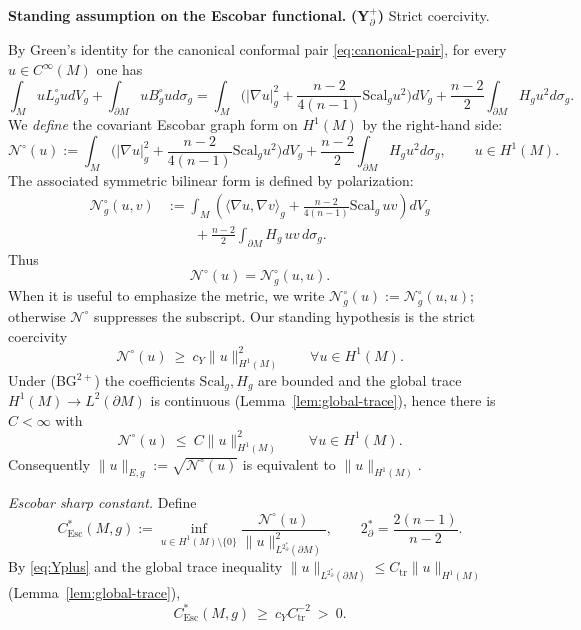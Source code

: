 \documentclass[11pt,reqno,a4paper]{amsart}
\numberwithin{equation}{section}
\theoremstyle{plain}
\newcommand{\Scal}{\mathrm{Scal}}
\theoremstyle{remark}
\theoremstyle{plain}
\begin{document}
\noindent\textbf{Standing assumption on the Escobar functional.}
\textbf{(Y$^+_{\partial}$)} Strict coercivity.

By Green's identity for the canonical conformal pair \eqref{eq:canonical-pair}, for every
$u\in C^\infty(M)$ one has
\[
\int_M uL_g^{\circ}udV_g+\int_{\partial M} uB_g^{\circ}ud\sigma_g
= \int_M\Big(|\nabla u|_g^2+\frac{n-2}{4(n-1)}\Scal_gu^2\Big)dV_g
 + \frac{n-2}{2}\int_{\partial M}H_gu^2d\sigma_g.
\]
We \emph{define} the covariant Escobar graph form on $H^1(M)$ by the right-hand side:
\begin{equation}\label{eq:Esc-energy-weak}
\mathcal N^\circ(u)
:=\int_M\Big(|\nabla u|_g^2+\frac{n-2}{4(n-1)}\Scal_gu^2\Big)dV_g
 + \frac{n-2}{2}\int_{\partial M}H_gu^2d\sigma_g,
\qquad u\in H^1(M).
\end{equation}
The associated symmetric bilinear form is defined by polarization:
\begin{equation}\label{eq:Esc-energy-bilinear}
\begin{aligned}
\mathcal N_g^\circ(u,v)
&:=
\int_M
\left(
\langle\nabla u,\nabla v\rangle_g
+
\frac{n-2}{4(n-1)}\Scal_g\,uv
\right)dV_g                                      \\
&\qquad
+
\frac{n-2}{2}
\int_{\partial M}H_g\,uv\,d\sigma_g .
\end{aligned}
\end{equation}
Thus
\[
\mathcal N^\circ(u)=\mathcal N_g^\circ(u,u).
\]
When it is useful to emphasize the metric, we write
$\mathcal N_g^\circ(u):=\mathcal N_g^\circ(u,u)$; otherwise
$\mathcal N^\circ$ suppresses the subscript.
Our standing hypothesis is the strict coercivity
\begin{equation}\label{eq:Yplus}
\mathcal N^\circ(u)\ \ge\ c_Y\|u\|_{H^1(M)}^2\qquad\forall u\in H^1(M).
\end{equation}
Under \textup{(BG$^{2+}$)} the coefficients $\Scal_g,H_g$ are bounded and the global trace
$H^1(M)\to L^2(\partial M)$ is continuous (Lemma~\ref{lem:global-trace}), hence there is $C<\infty$ with
\begin{equation}\label{eq:Esc-energy-continuity}
\mathcal N^\circ(u)\ \le\ C\|u\|_{H^1(M)}^2\qquad\forall u\in H^1(M).
\end{equation}
Consequently $\|u\|_{E,g}:=\sqrt{\mathcal N^\circ(u)}$ is equivalent to $\|u\|_{H^1(M)}$.

\medskip
\noindent\emph{Escobar sharp constant.}
Define
\begin{equation}\label{eq:Esc-sharp-constant}
C^*_{\mathrm{Esc}}(M,g):=\inf_{u\in H^1(M)\setminus\{0\}}
\frac{\mathcal N^\circ(u)}{\|u\|_{L^{2^*_\partial}(\partial M)}^2},
\qquad 2^*_\partial=\frac{2(n-1)}{n-2}.
\end{equation}
By \eqref{eq:Yplus} and the global trace inequality
$\|u\|_{L^{2^*_\partial}(\partial M)}\le C_{\mathrm{tr}}\|u\|_{H^1(M)}$ (Lemma~\ref{lem:global-trace}),
\begin{equation}\label{eq:Esc-strict-positive}
C^*_{\mathrm{Esc}}(M,g)\ \ge\ c_YC_{\mathrm{tr}}^{-2}\ >\ 0.
\end{equation}
\end{document}
